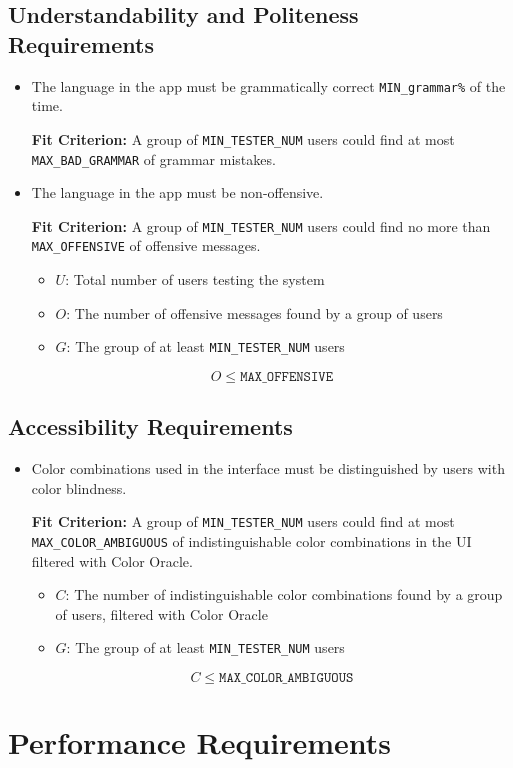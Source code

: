 \documentclass[12pt]{article}
\newcounter{nfrnum} %
\newcommand{\rthenfrnum}{NFR\refstepcounter{nfrnum}\thenfrnum:}
\begin{document}
\subsection{Understandability and Politeness Requirements}
\begin{itemize}
\item[\rthenfrnum]
The language in the app must be grammatically correct \texttt{MIN\_grammar\%} of the time.

\textbf{Fit Criterion:} A group of \texttt{MIN\_TESTER\_NUM}  users could find at most \texttt{MAX\_BAD\_GRAMMAR} of grammar mistakes.

\item[\rthenfrnum]
The language in the app must be non-offensive.

\textbf{Fit Criterion:} A group of \texttt{MIN\_TESTER\_NUM} users could find no more than \texttt{MAX\_OFFENSIVE} of offensive messages.
\begin{itemize}
    \item \( U \): Total number of users testing the system
    \item \( O \): The number of offensive messages found by a group of users
    \item \( G \): The group of at least \texttt{MIN\_TESTER\_NUM} users
\end{itemize}
\[
    O \leq \texttt{MAX\_OFFENSIVE}
\]
\end{itemize}
\subsection{Accessibility Requirements}
\begin{itemize}
\item[\rthenfrnum]
Color combinations used in the interface must be distinguished by users with color blindness.

\textbf{Fit Criterion:} A group of \texttt{MIN\_TESTER\_NUM} users could find at most \texttt{MAX\_COLOR\_AMBIGUOUS} of indistinguishable color combinations in the UI filtered with Color Oracle.
\begin{itemize}
    \item \( C \): The number of indistinguishable color combinations found by a group of users, filtered with Color Oracle
    \item \( G \): The group of at least \texttt{MIN\_TESTER\_NUM} users
\end{itemize}
\[
    C \leq \texttt{MAX\_COLOR\_AMBIGUOUS}
\]
\end{itemize}
\section{Performance Requirements}
\end{document}
